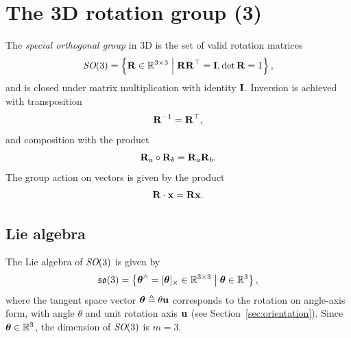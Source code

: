 \section{The 3D rotation group \SO(3)} \label{sec:SO3_group}
The \emph{special orthogonal group} in 3D is the set of valid rotation matrices
\begin{equation}
  \textit{SO}(3) = \left \{ {\boldsymbol{\mathbf{R}}} \in {\mathbb R}^{3 \times 3} \;\middle|\; {\boldsymbol{\mathbf{R}}}{\boldsymbol{\mathbf{R}}}^{\top} = {\boldsymbol{\mathbf{I}}}, \det {\boldsymbol{\mathbf{R}}} = 1 \right \},
\end{equation}
and is closed under matrix multiplication with identity ${\boldsymbol{\mathbf{I}}}$.
Inversion is achieved with transposition
\begin{equation}
  {\boldsymbol{\mathbf{R}}}^{-1} = {\boldsymbol{\mathbf{R}}}^{\top},
\end{equation}
and composition with the product
\begin{equation}
  {\boldsymbol{\mathbf{R}}}_a \circ {\boldsymbol{\mathbf{R}}}_b = {\boldsymbol{\mathbf{R}}}_a {\boldsymbol{\mathbf{R}}}_b.
\end{equation}
The group action on vectors is given by the product
\begin{equation} \label{eq:SO3-group-action}
  {\boldsymbol{\mathbf{R}}} \cdot {\boldsymbol{\mathbf{x}}} = {\boldsymbol{\mathbf{R}}} {\boldsymbol{\mathbf{x}}}.
\end{equation}

\subsection{Lie algebra}
The Lie algebra of $\textit{SO}(3)$ is given by
\begin{equation}
  {\mathfrak {so}}(3) = \left \{ {\boldsymbol{\mathbf{\theta}}}^\wedge = [{\boldsymbol{\mathbf{\theta}}}]_\times \in {\mathbb R}^{3 \times 3} \;\middle|\; {\boldsymbol{\mathbf{\theta}}} \in {\mathbb R}^3 \right \},
\end{equation}
where the tangent space vector ${\boldsymbol{\mathbf{\theta}}} \triangleq \theta {\boldsymbol{\mathbf{u}}}$ corresponds to the rotation on angle-axis form, with angle $\theta$ and unit rotation axis ${\boldsymbol{\mathbf{u}}}$ (see Section~\ref{sec:orientation}).
Since ${\boldsymbol{\mathbf{\theta}}} \in {\mathbb R}^3$, the dimension of $\textit{SO}(3)$ is $m = 3$.

